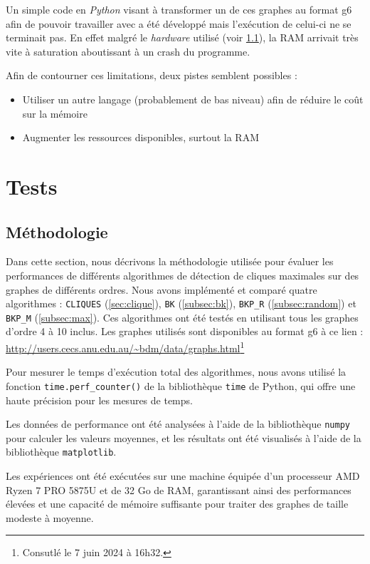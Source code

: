 \documentclass[12pt,a4paper]{article}
\begin{document}
Un simple code en \emph{Python} visant à transformer un de ces graphes au format g6 afin de pouvoir travailler avec a été développé mais l'exécution de celui-ci ne se terminait pas. En effet malgré le \emph{hardware} utilisé (voir \ref{subsec:methodo}), la RAM arrivait très vite à saturation aboutissant à un crash du programme.

Afin de contourner ces limitations, deux pistes semblent possibles :
\begin{itemize}
  \item Utiliser un autre langage (probablement de bas niveau) afin de réduire le coût sur la mémoire
  \item Augmenter les ressources disponibles, surtout la RAM
\end{itemize}

\section{Tests}%
\label{sec:tests}

\subsection{Méthodologie}%
\label{subsec:methodo}
Dans cette section, nous décrivons la méthodologie utilisée pour évaluer les performances de différents algorithmes de détection de cliques maximales sur des graphes de différents ordres. Nous avons implémenté et comparé quatre algorithmes : \texttt{CLIQUES} (\ref{sec:clique}), \texttt{BK} (\ref{subsec:bk}), \texttt{BKP\_R} (\ref{subsec:random}) et \texttt{BKP\_M} (\ref{subsec:max}). Ces algorithmes ont été testés en utilisant tous les graphes d'ordre 4 à 10 inclus. Les graphes utilisés sont disponibles au format g6 à ce lien : \url{http://users.cecs.anu.edu.au/~bdm/data/graphs.html}\footnote{Consutlé le 7 juin 2024 à 16h32.}

Pour mesurer le temps d'exécution total des algorithmes, nous avons utilisé la fonction \texttt{time.perf\_counter()} de la bibliothèque \texttt{time} de Python, qui offre une haute précision pour les mesures de temps.

Les données de performance ont été analysées à l'aide de la bibliothèque \texttt{numpy} pour calculer les valeurs moyennes, et les résultats ont été visualisés à l'aide de la bibliothèque \texttt{matplotlib}.

Les expériences ont été exécutées sur une machine équipée d'un processeur AMD Ryzen 7 PRO 5875U et de 32 Go de RAM, garantissant ainsi des performances élevées et une capacité de mémoire suffisante pour traiter des graphes de taille modeste à moyenne.
\end{document}
